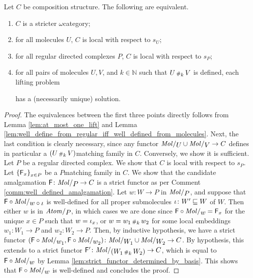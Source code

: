 \begin{lem} \label{lem:stricter_iff_local_wrt_pasting}
    Let \( C \) be composition structure.
    The following are equivalent.
    \begin{enumerate}
        \item \( C \) is a stricter \( \omega \)\nbd category;
        \item for all molecules \( U \), \( C \) is local with respect to \( s_U \);
        \item for all regular directed complexes \( P \), \( C \) is local with respect to \( s_P \);
        \item for all pairs of molecules \( U, V \), and \( k \in \mathbb{N} \) such that \( U \,{\scriptstyle\#}_{k}\, V \) is defined, each lifting problem
        \begin{center}
        \end{center}
        has a (necessarily unique) solution.
    \end{enumerate}
\end{lem}
\begin{proof}
    The equivalences between the first three points directly follows from Lemma \ref{lem:at_most_one_lift} and Lemma \ref{lem:well_define_from_regular_iff_well_defined_from_molecules}.
    Next, the last condition is clearly necessary, since any functor \( \molecin{U} \cup \molecin{V} \to C \) defines in particular a \( (U \,{\scriptstyle\#}_{k}\, V) \)\nbd matching family in \( C \).
    Conversely, we show it is sufficient.
    Let \( P \) be a regular directed complex.
    We show that \( C \) is local with respect to \( s_P \).
    Let \( \left\{ {\mathsf{F}_x} \right\}_{x \in P} \) be a \( P \)\nbd matching family in \( C \).
    We show that the candidate amalgamation \( \F \colon \molecin{P} \to C \) is a strict functor as per Comment \ref{comm:well_defined_amalgamation}.
    Let \( w \colon W \to P \) in \( \molecin{P} \), and suppose that \( \F \after \molecin{w \after \iota} \) is well-defined for all proper submolecules \( \iota \colon W' \sqsubseteq W \) of \( W \).
    Then either \( w \) is in \( \atomin{P} \), in which cases we are done since \( \F \after \molecin{w} = \F_x \) for the unique \( x \in P \) such that \( w = \iota_{x} \), or \( w = w_1 \,{\scriptstyle\#}_{k}\, w_2 \) for some local embeddings \( w_1 \colon W_1 \to P \) and \( w_2 \colon W_2 \to P \).
    Then, by inductive hypothesis, we have a strict functor \( (\F \after \molecin{w_1}, \F \after \molecin{w_2}) \colon \molecin{W_1} \cup \molecin{W_2} \to C \).
    By hypothesis, this extends to a strict functor \( \F' \colon \molecin{(W_1 \cp{k} W_2)} \to C \), which is equal to \( \F \after \molecin{w} \) by Lemma \ref{lem:strict_functor_determined_by_basis}.
    This shows that \( \F \after \molecin{w} \) is well-defined and concludes the proof.
\end{proof}


